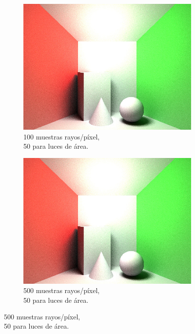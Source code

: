 \begin{figure}[H]
	\centering
	\begin{subfigure}{0.33\textwidth}
		\centering
		\includegraphics[width=.98\linewidth]{media/ray_100s.jpg}
		\captionsetup{width=0.98\textwidth, justification=centering}
		\caption*{100 muestras rayos/píxel,\\ 50 para luces de área.}
	\end{subfigure}%
	\begin{subfigure}{0.33\textwidth}
		\centering
		\includegraphics[width=.98\linewidth]{media/ray_500s.jpg}
		\captionsetup{width=0.98\textwidth, justification=centering}
		\caption*{500 muestras rayos/píxel,\\ 50 para luces de área.}
	\end{subfigure}%

\end{figure}
